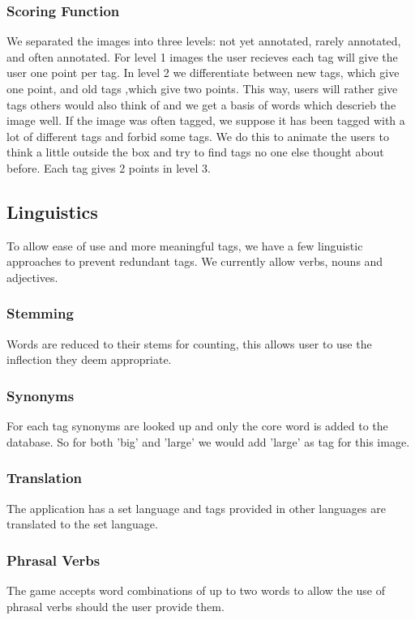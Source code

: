 \subsubsection{Scoring Function}
\label{g14:sec:concepts:spamprevention:scoringfunction}
We separated the images into three levels: not yet annotated, rarely annotated, and often annotated. For level 1 images the user recieves each tag will give the user one point per tag. In level 2 we differentiate between new tags, which give one point, and old tags ,which give two points. This way, users will rather give tags others would also think of and we get a basis of words which descrieb the image well. If the image was often tagged, we suppose it has been tagged with a lot of different tags and forbid some tags. We do this to animate the users to think a little outside the box and try to find tags no one else thought about before. Each tag gives 2 points in level 3.


\subsection{Linguistics}
\label{g14:sec:concepts:linguistics}
To allow ease of use and more meaningful tags, we have a few linguistic approaches to prevent redundant tags. We currently allow verbs, nouns and adjectives.



\subsubsection{Stemming}
\label{g14:sec:concepts:linguistics:stemming}
Words are reduced to their stems for counting, this allows user to use the inflection they deem appropriate.


\subsubsection{Synonyms}
\label{g14:sec:concepts:linguistics:synonyms}
For each tag synonyms are looked up and only the core word is added to the database. So for both 'big' and 'large' we would add 'large' as tag for this image.


\subsubsection{Translation}
\label{g14:sec:concepts:linguistics:translation}
The application has a set language and tags provided in other languages are translated to the set language.


\subsubsection{Phrasal Verbs}
\label{g14:sec:concepts:linguistics:phraselverbs}
The game accepts word combinations of up to two words to allow the use of phrasal verbs should the user provide them.


